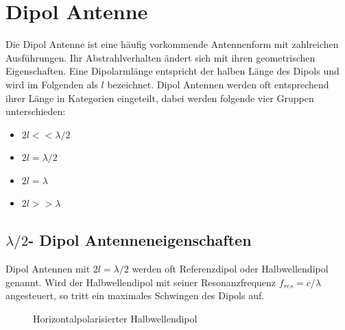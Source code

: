 \section{Dipol Antenne}
Die Dipol Antenne ist eine häufig vorkommende Antennenform  mit zahlreichen Ausführungen. Ihr Abstrahlverhalten ändert sich mit ihren geometrischen Eigenschaften. Eine Dipolarmlänge entspricht der halben Länge des Dipols und wird im Folgenden als $l$ bezeichnet. Dipol Antennen werden oft entsprechend ihrer Länge in Kategorien eingeteilt, dabei werden folgende vier Gruppen unterschieden:
\begin{itemize}
\item $2l<< \lambda/2 $
\item $2l = \lambda/2 $
\item $2l = \lambda $
\item $2l>> \lambda $
\end{itemize} 
\subsection{$\lambda/2$- Dipol Antenneneigenschaften}
Dipol Antennen mit $2l=\lambda/2$ werden oft Referenzdipol oder Halbwellendipol genannt. Wird der Halbwellendipol mit seiner Resonanzfrequenz $f_{res}=c/\lambda$ angesteuert, so tritt ein maximales Schwingen des Dipols auf. 

\begin{figure}[!ht]%
	\begin{center}
	\end{center}
\caption{Horizontalpolarisierter Halbwellendipol}
\label{fig:HalbWellenDipolHorizontal}
\end{figure}

